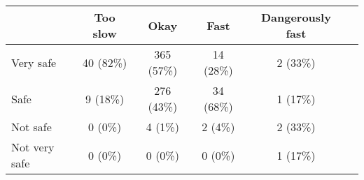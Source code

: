 \begin{tabular}{l c|c|c|c|c} \hline  & Too slow & Okay & Fast & Dangerously fast \\ 
\hline Very safe & 40 (82\%) & 365 (57\%) & 14 (28\%) & 2 (33\%) \\ 
  Safe & 9 (18\%) & 276 (43\%) & 34 (68\%) & 1 (17\%) \\ 
  Not safe & 0 (0\%) & 4 (1\%) & 2 (4\%) & 2 (33\%) \\ 
  Not very safe & 0 (0\%) & 0 (0\%) & 0 (0\%) & 1 (17\%) \\ 
 \hline \end{tabular}